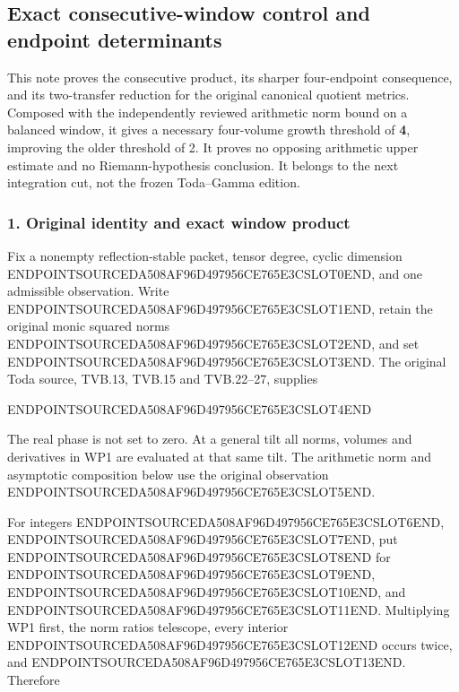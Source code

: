 \subsection{Exact consecutive-window control and endpoint determinants}\label{endpoint-window_product_owner--exact-consecutive-window-control-and-endpoint-determinants}

This note proves the consecutive product, its sharper four-endpoint consequence, and its two-transfer reduction for the original canonical quotient metrics. Composed with the independently reviewed arithmetic norm bound on a balanced window, it gives a necessary four-volume growth threshold of \textbf{4}, improving the older threshold of 2. It proves no opposing arithmetic upper estimate and no Riemann-hypothesis conclusion. It belongs to the next integration cut, not the frozen Toda--Gamma edition.

\subsubsection{1. Original identity and exact window product}\label{endpoint-window_product_owner--original-identity-and-exact-window-product}

Fix a nonempty reflection-stable packet, tensor degree, cyclic dimension ENDPOINTSOURCEDA508AF96D497956CE765E3CSLOT0END, and one admissible observation. Write ENDPOINTSOURCEDA508AF96D497956CE765E3CSLOT1END, retain the original monic squared norms ENDPOINTSOURCEDA508AF96D497956CE765E3CSLOT2END, and set ENDPOINTSOURCEDA508AF96D497956CE765E3CSLOT3END. The original Toda source, TVB.13, TVB.15 and TVB.22--27, supplies

ENDPOINTSOURCEDA508AF96D497956CE765E3CSLOT4END

The real phase is not set to zero. At a general tilt all norms, volumes and derivatives in WP1 are evaluated at that same tilt. The arithmetic norm and asymptotic composition below use the original observation ENDPOINTSOURCEDA508AF96D497956CE765E3CSLOT5END.

For integers ENDPOINTSOURCEDA508AF96D497956CE765E3CSLOT6END, ENDPOINTSOURCEDA508AF96D497956CE765E3CSLOT7END, put ENDPOINTSOURCEDA508AF96D497956CE765E3CSLOT8END for ENDPOINTSOURCEDA508AF96D497956CE765E3CSLOT9END, ENDPOINTSOURCEDA508AF96D497956CE765E3CSLOT10END, and ENDPOINTSOURCEDA508AF96D497956CE765E3CSLOT11END. Multiplying WP1 first, the norm ratios telescope, every interior ENDPOINTSOURCEDA508AF96D497956CE765E3CSLOT12END occurs twice, and ENDPOINTSOURCEDA508AF96D497956CE765E3CSLOT13END. Therefore

